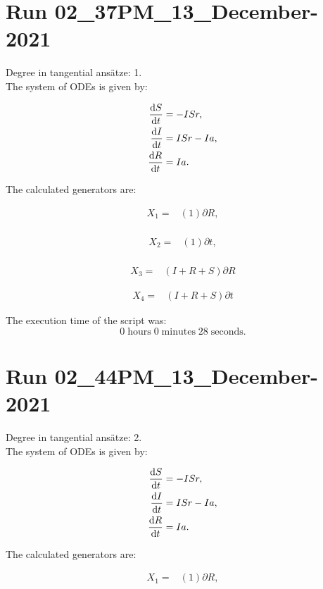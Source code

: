 \section*{Run 02\_37PM\_13\_December-2021}
Degree in tangential ansätze:	1.\\
The system of ODEs is given by:

\begin{align*}
\dv{S}{t}&=- I S r,\\
\dv{I}{t}&=I S r - I a,\\
\dv{R}{t}&=I a.\\
\end{align*}

\noindent The calculated generators are:

\begin{align*}
X_{1}=&\left(1 \right)\partial R,\\
\end{align*}

\begin{align*}
X_{2}=&\left(1 \right)\partial t,\\
\end{align*}

\begin{align*}
X_{3}=&\left(I+R+S \right)\partial R
\end{align*}

\begin{align*}
X_{4}=&\left(I+R+S \right)\partial t
\end{align*}

\noindent The execution time of the script was:
$$0\;\mathrm{hours}\;0\;\mathrm{minutes}\;28 \;\mathrm{seconds}.$$
\section*{Run 02\_44PM\_13\_December-2021}
Degree in tangential ansätze:	2.\\
The system of ODEs is given by:

\begin{align*}
\dv{S}{t}&=- I S r,\\
\dv{I}{t}&=I S r - I a,\\
\dv{R}{t}&=I a.\\
\end{align*}

\noindent The calculated generators are:

\begin{align*}
X_{1}=&\left(1 \right)\partial R,\\
\end{align*}

